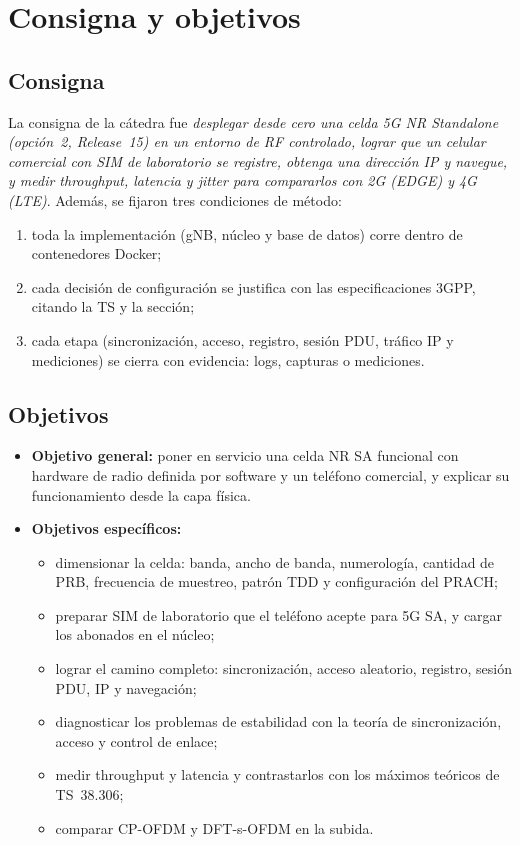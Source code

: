 \section{Consigna y objetivos}\label{sec:consigna}

\subsection{Consigna}
La consigna de la cátedra fue \emph{desplegar desde cero una celda 5G NR Standalone (opción~2, Release~15) en un entorno de RF controlado, lograr que un celular comercial con SIM de laboratorio se registre, obtenga una dirección IP y navegue, y medir throughput, latencia y jitter para compararlos con 2G (EDGE) y 4G (LTE)}. Además, se fijaron tres condiciones de método:
\begin{enumerate}
  \item toda la implementación (gNB, núcleo y base de datos) corre dentro de contenedores Docker;
  \item cada decisión de configuración se justifica con las especificaciones 3GPP, citando la TS y la sección;
  \item cada etapa (sincronización, acceso, registro, sesión PDU, tráfico IP y mediciones) se cierra con evidencia: logs, capturas o mediciones.
\end{enumerate}

\subsection{Objetivos}
\begin{itemize}
  \item \textbf{Objetivo general:} poner en servicio una celda NR SA funcional con hardware de radio definida por software y un teléfono comercial, y explicar su funcionamiento desde la capa física.
  \item \textbf{Objetivos específicos:}
  \begin{itemize}
    \item dimensionar la celda: banda, ancho de banda, numerología, cantidad de PRB, frecuencia de muestreo, patrón TDD y configuración del PRACH;
    \item preparar SIM de laboratorio que el teléfono acepte para 5G SA, y cargar los abonados en el núcleo;
    \item lograr el camino completo: sincronización, acceso aleatorio, registro, sesión PDU, IP y navegación;
    \item diagnosticar los problemas de estabilidad con la teoría de sincronización, acceso y control de enlace;
    \item medir throughput y latencia y contrastarlos con los máximos teóricos de TS~38.306;
    \item comparar CP-OFDM y DFT-s-OFDM en la subida.
  \end{itemize}
\end{itemize}

